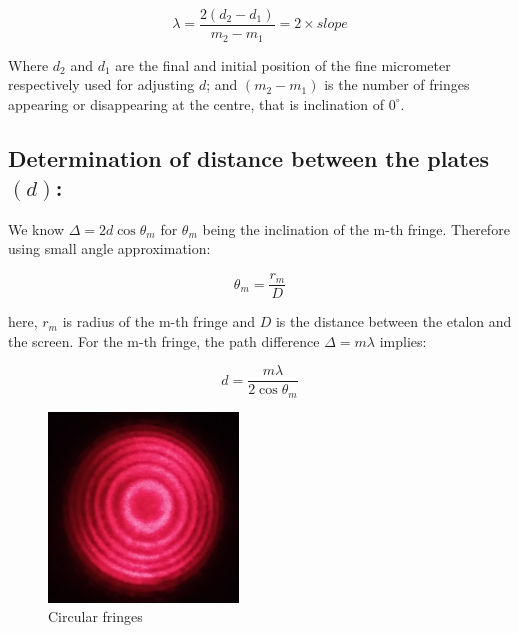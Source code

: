 		\begin{equation}
			\lambda = \frac{2(d_2-d_1)}{m_2-m_1} = 2\times slope
			\label{eq:1}
		\end{equation}

		Where $d_2$ and $d_1$ are the final and initial position of the
		fine micrometer respectively used for adjusting $d$; and
		$(m_2 - m_1)$ is the number of fringes appearing or disappearing
		at the centre, that is inclination of $0^\circ$.

	\subsection{Determination of distance between the plates $(d)$:}

		We know $\Delta = 2d\cos\theta_m$ for $\theta_m$ being the inclination of the m-th fringe. Therefore using small angle approximation:

			$$\theta_m = \frac{r_m}{D}$$

		here, $r_m$ is radius of the m-th fringe and $D$ is the distance between the etalon and the screen. For the m-th fringe, the path difference $\Delta = m\lambda$ implies:
		
		\begin{equation}
			d= \frac{m\lambda}{2\cos\theta_m}
			\label{eq:2}
		\end{equation}

		\begin{figure}[H]
			\centering
			\includegraphics[width=0.45\textwidth]{images/1.jpg}
			\caption{Circular fringes}
			\label{fig:3}
		\end{figure}